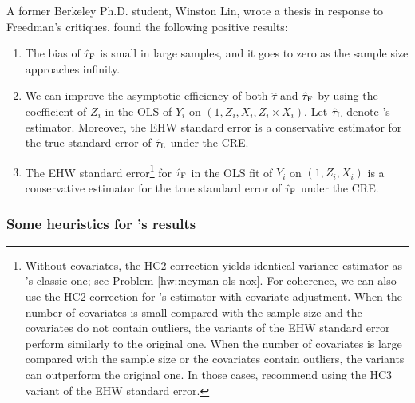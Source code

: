 A former Berkeley Ph.D. student, Winston Lin, wrote a thesis in response to Freedman's critiques. \citet{lin2013} found the following positive results:
\begin{enumerate}
[(1)]
\item
The bias of $\hat{\tau}_\textsc{F}$ is small in large samples, and it goes to zero as the sample size approaches infinity.
\item
We can improve the asymptotic efficiency of both $\hat{\tau}$ and $\hat{\tau}_\textsc{F}$ by using the coefficient of $Z_i$ in the OLS of $Y_i$ on $(1, Z_i, X_i, Z_i\times X_i)$. Let $\hat{\tau}_\textsc{L}$ denote \citet{lin2013}'s estimator. Moreover, the EHW standard error is a conservative estimator for the true standard error of $\hat{\tau}_\textsc{L}$ under the CRE. 
\item
The EHW standard error\footnote{Without covariates, the HC2 correction yields identical variance estimator as \citet{Neyman:1923}'s classic one; see Problem \ref{hw::neyman-ols-nox}. For coherence, we can also use the HC2 correction for \citet{lin2013}'s estimator with covariate adjustment. When the number of covariates is small compared with the sample size and the covariates do not contain outliers, the variants of the EHW standard error perform similarly to the original one. When the number of covariates is large compared with the sample size or the covariates contain outliers, the variants can outperform the original one. In those cases, \citet{lei2018regression} recommend using the HC3 variant of the EHW standard error.} 
for $\hat{\tau}_\textsc{F}$ in the OLS fit of $Y_i$ on $(1, Z_i, X_i)$ is  a conservative estimator for the true standard error of $\hat{\tau}_\textsc{F}$ under the CRE. 
\end{enumerate}


\subsubsection{Some heuristics for \citet{lin2013}'s results}


